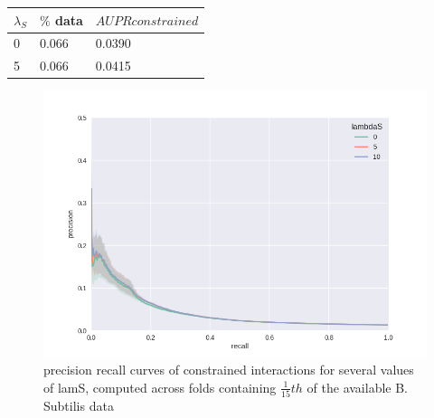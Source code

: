 \documentclass[11pt]{article}
\begin{document}
\begin{center}
  \begin{tabular}{ l | l | l }
    \hline
    $\lambda_S$ & $\%$ data & $AUPR constrained$ \\ \hline
    0 & 0.066 & 0.0390 \\
    5 & 0.066 & 0.0415 \\
    \hline
  \end{tabular}
\end{center}


\begin{figure}
\begin{center}
  \includegraphics[scale=0.45]{waka7unnormed.png}
  \caption{\label{fig:figure1} precision recall curves of constrained interactions for several values of lamS, computed across folds containing $\frac{1}{15}th$ of the available B. Subtilis data}
  \end{center}
\end{figure}
\end{document}
